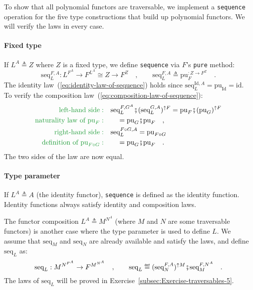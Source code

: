 To show that all polynomial functors are traversable, we implement
a \lstinline!sequence! operation for the five type constructions
that build up polynomial functors. We will verify the laws in every
case.

\paragraph{Fixed type}

If $L^{A}\triangleq Z$ where $Z$ is a fixed type, we define \lstinline!sequence!
via $F$\textsf{'}s \lstinline!pure! method:
\[
\text{seq}_{L}^{F,A}:L^{F^{A}}\rightarrow F^{L^{A}}\cong Z\rightarrow F^{Z}\quad,\quad\quad\text{seq}_{L}^{F,A}\triangleq\text{pu}_{F}^{:Z\rightarrow F^{Z}}\quad.
\]
The identity law~(\ref{eq:identity-law-of-sequence}) holds since
$\text{seq}_{L}^{\text{Id},A}=\text{pu}_{\text{Id}}=\text{id}$. To
verify the composition law~(\ref{eq:composition-law-of-sequence}):
\begin{align*}
{\color{greenunder}\text{left-hand side}:}\quad & \text{seq}_{L}^{F,G^{A}}\bef(\text{seq}_{L}^{G,A})^{\uparrow F}=\text{pu}_{F}\bef(\text{pu}_{G})^{\uparrow F}\\
{\color{greenunder}\text{naturality law of }\text{pu}_{F}:}\quad & \quad=\text{pu}_{G}\bef\text{pu}_{F}\quad,\\
{\color{greenunder}\text{right-hand side}:}\quad & \text{seq}_{L}^{F\circ G,A}=\text{pu}_{F\circ G}\\
{\color{greenunder}\text{definition of }\text{pu}_{F\circ G}:}\quad & \quad=\text{pu}_{G}\bef\text{pu}_{F}\quad.
\end{align*}
The two sides of the law are now equal.

\paragraph{Type parameter}

If $L^{A}\triangleq A$ (the identity functor), \lstinline!sequence!
is defined as the identity function. Identity functions always satisfy
identity and composition laws.

The functor composition $L^{A}\triangleq M^{N^{A}}$ (where $M$ and
$N$ are some traversable functors) is another case where the type
parameter is used to define $L$. We assume that $\text{seq}_{M}$
and $\text{seq}_{N}$ are already available and satisfy the laws,
and define $\text{seq}_{L}$ as:
\begin{equation}
\text{seq}_{L}:M^{N^{F^{A}}}\rightarrow F^{M^{N^{A}}}\quad,\quad\quad\text{seq}_{L}\triangleq(\text{seq}_{N}^{F,A})^{\uparrow M}\bef\text{seq}_{M}^{F,N^{A}}\quad.\label{eq:def-sequence-for-functor-composition}
\end{equation}
The laws of $\text{seq}_{L}$ will be proved in Exercise~\ref{subsec:Exercise-traversables-5}.

